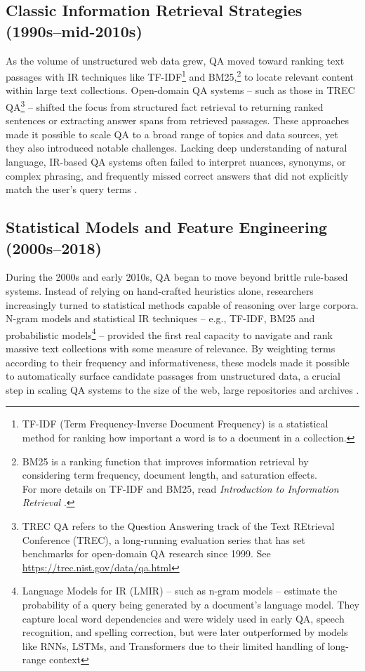 \begin{spacing}{1.5}
\subsection{Classic Information Retrieval Strategies (1990s--mid-2010s)}
As the volume of unstructured web data grew, QA moved toward ranking text passages with IR techniques like TF-IDF\footnote{TF-IDF (Term Frequency-Inverse Document Frequency) is a statistical method for ranking how important a word is to a document in a collection.} and BM25,\footnote{BM25 is a ranking function that improves information retrieval by considering term frequency, document length, and saturation effects.\\For more details on TF-IDF and BM25, read \textit{Introduction to Information Retrieval} \citep{manning_introduction_2008}.} to locate relevant content within large text collections. Open-domain QA systems -- such as those in TREC QA\footnote{TREC QA refers to the Question Answering track of the Text REtrieval Conference (TREC), a long-running evaluation series that has set benchmarks for open-domain QA research since 1999. See \url{https://trec.nist.gov/data/qa.html}} \citep{hirschman_natural_2001} -- shifted the focus from structured fact retrieval to returning ranked sentences or extracting answer spans from retrieved passages. These approaches made it possible to scale QA to a broad range of topics and data sources, yet they also introduced notable challenges. Lacking deep understanding of natural language, IR-based QA systems often failed to interpret nuances, synonyms, or complex phrasing, and frequently missed correct answers that did not explicitly match the user’s query terms \citep{antoniou_survey_2022, caballero_brief_2021}.

\subsection{Statistical Models and Feature Engineering (2000s--2018)}
During the 2000s and early 2010s, QA began to move beyond brittle rule-based systems. Instead of relying on hand-crafted heuristics alone, researchers increasingly turned to statistical methods capable of reasoning over large corpora. N-gram models and statistical IR techniques -- e.g., TF-IDF, BM25 and probabilistic models\footnote{Language Models for IR (LMIR) -- such as n-gram models -- estimate the probability of a query being generated by a document's language model. They capture local word dependencies and were widely used in early QA, speech recognition, and spelling correction, \citep{ponte_language_1998} but were later outperformed by models like RNNs, LSTMs, and Transformers due to their limited handling of long-range context} -- provided the first real capacity to navigate and rank massive text collections with some measure of relevance. By weighting terms according to their frequency and informativeness, these models made it possible to automatically surface candidate passages from unstructured data, a crucial step in scaling QA systems to the size of the web, large repositories and archives \citep{manning_introduction_2008}.


\end{spacing}

